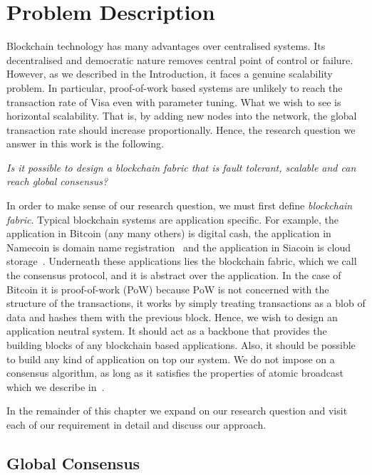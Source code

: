 \chapter{Problem Description}
\label{ch:problem}

Blockchain technology has many advantages over centralised systems.
Its decentralised and democratic nature removes central point of control or failure.
However, as we described in the Introduction, it faces a genuine scalability problem.
In particular, proof-of-work based systems are unlikely to reach the transaction rate of Visa even with parameter tuning.
What we wish to see is horizontal scalability.
That is, by adding new nodes into the network, the global transaction rate should increase proportionally.
Hence, the research question we answer in this  work is the following.
\begin{displayquote}
\emph{Is it possible to design a blockchain fabric that is fault tolerant, scalable and can reach global consensus?}
\end{displayquote}

In order to make sense of our research question, we must first define \emph{blockchain fabric}.
Typical blockchain systems are application specific.
For example, the application in Bitcoin (any many others) is digital cash, the application in Namecoin is domain name registration~\cite{namecoin} and the application in Siacoin is cloud storage~\cite{siacoin}.
Underneath these applications lies the blockchain fabric, which we call the consensus protocol, and it is abstract over the application.
In the case of Bitcoin it is proof-of-work (PoW) because PoW is not concerned with the structure of the transactions,
it works by simply treating transactions as a blob of data and hashes them with the previous block.
Hence, we wish to design an application neutral system.
It should act as a backbone that provides the building blocks of any blockchain based applications.
Also, it should be possible to build any kind of application on top our system.
We do not impose on a consensus algorithm, as long as it satisfies the properties of atomic broadcast which we describe in~.

In the remainder of this chapter we expand on our research question and visit each of our requirement in detail and discuss our approach.

\section{Global Consensus}

